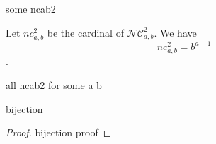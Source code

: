 \begin{example}
    some ncab2
\end{example}

\begin{theorem}
    Let $nc^2_{a,b}$ be the cardinal of $\mathcal{NC}^2_{a,b}$.
    We have $$nc^2_{a,b} = b^{a-1}$$.    
\end{theorem}

\begin{example}
    all ncab2 for some a b
\end{example}

\begin{prop}
    bijection
\end{prop}

\begin{proof}
    bijection proof
\end{proof}